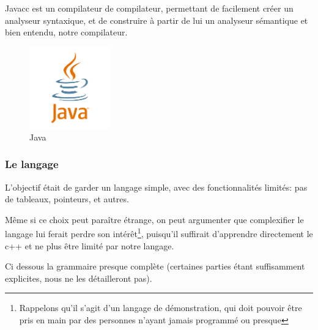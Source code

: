 \documentclass[a4paper,11pt]{article}
\begin{document}
        Javacc est un compilateur de compilateur, permettant de facilement créer un analyseur syntaxique, et de construire à partir de lui un analyseur sémantique et bien entendu, notre compilateur.
				
				\begin{figure}[!h]
            \begin{center}
                \includegraphics[width=100pt]{img/java.png}
                \caption{Java}
            \end{center}
        \end{figure}

    \subsubsection{Le langage}
        L'objectif était de garder un langage simple, avec des fonctionnalités limités: pas de tableaux, pointeurs, et autres.

        Même si ce choix peut paraître étrange, on peut argumenter que complexifier le langage lui ferait perdre son intérêt\footnote{Rappelons qu'il s'agit d'un langage de démonstration, qui doit pouvoir être pris en main par des personnes n'ayant jamais programmé ou presque}, puisqu'il suffirait d'apprendre directement le c++ et ne plus être limité par notre langage.
        
        Ci dessous la grammaire presque complète (certaines parties étant suffisamment explicites, nous ne les détailleront pas).
\end{document}
